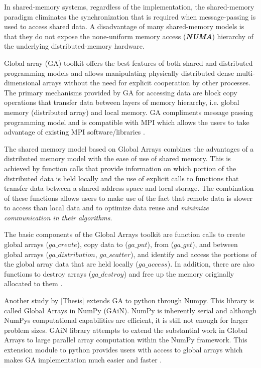 In shared-memory systems, regardless of the implementation, the shared-memory paradigm eliminates the synchronization that is required when message-passing is used to access shared data. 
A disadvantage of many shared-memory models is that they do not expose the none-uniform memory access (\textbf{\textit{NUMA}}) hierarchy of the underlying distributed-memory hardware. 

Global array (GA) toolkit offers the best features of both shared and distributed programming models and allows manipulating physically distributed dense multi-dimensional arrays without the need for explicit cooperation by other processes.
The primary mechanisms provided by GA for accessing data are block copy operations that transfer data between layers of memory hierarchy, i.e. global memory (distributed array) and local memory. 
GA compliments message passing programming model and is compatible with MPI which allows the users to take advantage of existing MPI software/libraries \cite{GA}.

The shared memory model based on Global Arrays combines the advantages of a distributed memory model with the ease of use of shared memory. 
This is achieved by function calls that provide information on which portion of the distributed data is held locally and the use of explicit calls to functions that transfer data between a shared address space and local storage. 
The combination of these functions allows users to make use of the fact that remote data is slower to access than local data and to optimize data reuse and \emph{minimize communication in their algorithms}.

The basic components of the Global Arrays toolkit are function calls to create global arrays ($ga\_create$), copy data to ($ga\_put$), from ($ga\_get$), and between global arrays ($ga\_distribution$, $ga\_scatter$), and identify and access the portions of the global array data that are held locally ($ga\_access$). 
In addition, there are also functions to destroy arrays ($ga\_destroy$) and free up the memory originally allocated to them \cite{GAiN}.

Another study by [Thesis] extends GA to python through Numpy. This library is called Global Arrays in NumPy (GAiN).
NumPy is inherently serial and although NumPy\textsc{}s computational capabilities are efficient, it is still not enough for larger problem sizes. 
GAiN library attempts to extend the substantial work in Global Arrays to large parallel array computation within the NumPy framework.
This extension module to python provides users with access to global arrays which makes GA implementation much easier and faster \cite{GAiN}. 

